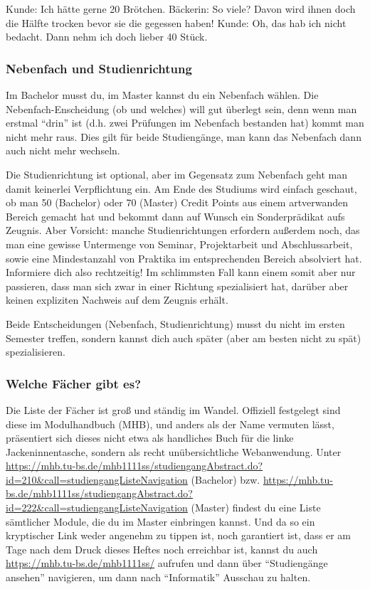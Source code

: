 Kunde: Ich hätte gerne 20 Brötchen. 
Bäckerin: So viele? Davon wird ihnen doch die Hälfte trocken bevor sie die gegessen haben!
Kunde: Oh, das hab ich nicht bedacht. Dann nehm ich doch lieber 40 Stück.

\subsubsection{Nebenfach und Studienrichtung}
\label{nebenfach}
Im Bachelor musst du, im Master kannst du ein Nebenfach wählen.
 Die Nebenfach-Enscheidung (ob und welches) will gut überlegt sein, denn wenn man
 erstmal "`drin"' ist (d.h. zwei Prüfungen im Nebenfach bestanden hat)
 kommt man nicht mehr raus. Dies gilt für beide Studiengänge, man kann
 das Nebenfach dann auch nicht mehr wechseln. 
 
Die Studienrichtung ist  optional, aber im Gegensatz zum Nebenfach
geht man damit keinerlei Verpflichtung ein. Am Ende des Studiums wird
einfach geschaut, ob man 50 (Bachelor) oder 70 (Master) Credit Points
aus einem artverwanden Bereich gemacht hat und bekommt dann auf Wunsch
ein Sonderprädikat aufs Zeugnis. Aber Vorsicht: manche Studienrichtungen
erfordern außerdem noch, das man eine gewisse Untermenge von Seminar, 
Projektarbeit und Abschlussarbeit, sowie eine Mindestanzahl von Praktika
im entsprechenden Bereich absolviert hat. Informiere dich also rechtzeitig!
Im schlimmsten Fall kann einem somit aber nur passieren, dass man sich zwar
in einer Richtung spezialisiert hat, darüber aber keinen expliziten Nachweis
auf dem Zeugnis erhält.

Beide Entscheidungen (Nebenfach, Studienrichtung) musst du nicht im 
ersten Semester treffen, sondern kannst dich auch später (aber am besten 
nicht zu spät) spezialisieren.

\subsubsection{Welche Fächer gibt es?}
Die Liste der Fächer ist groß und ständig im Wandel. Offiziell
festgelegt sind diese im Modulhandbuch (MHB), und anders als der Name
vermuten lässt, präsentiert sich dieses nicht etwa als handliches Buch
für die linke Jackeninnentasche, sondern als recht unübersichtliche
Webanwendung. Unter
\url{https://mhb.tu-bs.de/mhb1111ss/studiengangAbstract.do?id=210&call=studiengangListeNavigation} (Bachelor) bzw. \url{https://mhb.tu-bs.de/mhb1111ss/studiengangAbstract.do?id=222&call=studiengangListeNavigation} (Master)
findest du eine Liste sämtlicher Module, die du im Master einbringen kannst. Und da so ein kryptischer Link weder angenehm zu tippen ist, noch garantiert ist, dass er am Tage nach dem Druck dieses Heftes noch erreichbar ist, kannst du auch \url{https://mhb.tu-bs.de/mhb1111ss/} aufrufen und dann über "`Studiengänge ansehen"' navigieren, um dann nach "`Informatik"' Ausschau zu halten.


